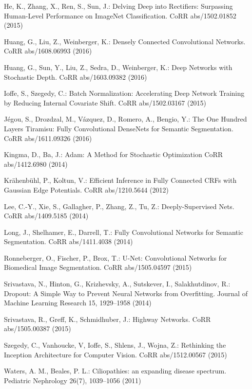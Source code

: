 \documentclass{llncs}
\begin{document}
\begin{thebibliography}{26}
He, K., Zhang, X., Ren, S., Sun, J.:
Delving Deep into Rectifiers: Surpassing Human-Level Performance on ImageNet Classification.
CoRR abs/1502.01852 (2015)

Huang, G., Liu, Z., Weinberger, K.:
Densely Connected Convolutional Networks.
CoRR abs/1608.06993 (2016)

Huang, G., Sun, Y., Liu, Z., Sedra, D., Weinberger, K.:
Deep Networks with Stochastic Depth.
CoRR abs/1603.09382 (2016)

Ioffe, S., Szegedy, C.:
Batch Normalization: Accelerating Deep Network Training by Reducing Internal Covariate Shift.
CoRR abs/1502.03167 (2015)

J{\'{e}}gou, S., Drozdzal, M., V{\'{a}}zquez, D., Romero, A., Bengio, Y.:
The One Hundred Layers Tiramisu: Fully Convolutional DenseNets for Semantic Segmentation.
CoRR abs/1611.09326 (2016)

Kingma, D., Ba, J.:
Adam: {A} Method for Stochastic Optimization
CoRR abs/1412.6980 (2014)

Kr{\"{a}}henb{\"{u}}hl, P., Koltun, V.:
Efficient Inference in Fully Connected CRFs with Gaussian Edge Potentials.
CoRR abs/1210.5644 (2012)

Lee, C.-Y., Xie, S., Gallagher, P., Zhang, Z., Tu, Z.:
Deeply-Supervised Nets.
CoRR abs/1409.5185 (2014)

Long, J., Shelhamer, E., Darrell, T.:
Fully Convolutional Networks for Semantic Segmentation.
CoRR abs/1411.4038 (2014)

Ronneberger, O., Fischer, P., Brox, T.:
U-Net: Convolutional Networks for Biomedical Image Segmentation.
CoRR abs/1505.04597 (2015)

Srivastava, N., Hinton, G., Krizhevsky, A., Sutskever, I., Salakhutdinov, R.:
Dropout: A Simple Way to Prevent Neural Networks from Overfitting.
Journal of Machine Learning Research 15, 1929--1958 (2014)

Srivastava, R., Greff, K., Schmidhuber, J.:
Highway Networks.
CoRR abs/1505.00387 (2015)

Szegedy, C., Vanhoucke, V, Ioffe, S., Shlens, J., Wojna, Z.:
Rethinking the Inception Architecture for Computer Vision.
CoRR abs/1512.00567 (2015)

Waters, A. M., Beales, P. L.:
Ciliopathies: an expanding disease spectrum.
Pediatric Nephrology 26(7), 1039--1056 (2011)


\end{thebibliography}
\end{document}
